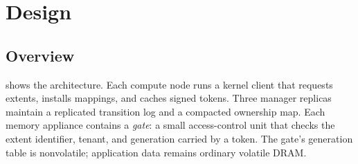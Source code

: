 \section{Design}
\label{sec:design}

\subsection{Overview}

 shows the architecture. Each compute node runs a
kernel client that requests extents, installs mappings, and caches signed
tokens. Three manager replicas maintain a replicated transition log and a
compacted ownership map. Each memory appliance contains a \emph{gate}: a small
access-control unit that checks the extent identifier, tenant, and generation
carried by a token. The gate's generation table is nonvolatile; application
data remains ordinary volatile DRAM.

